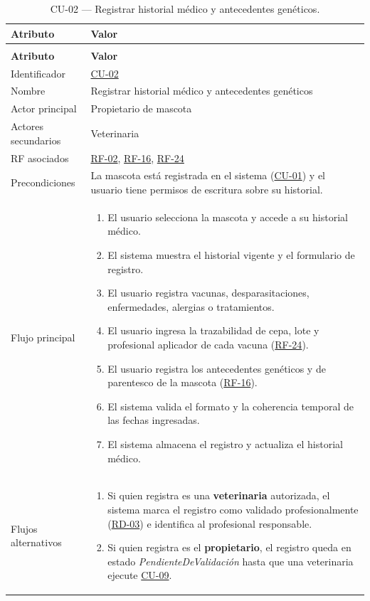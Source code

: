\documentclass[journal,onecolumn]{IEEEtran}
\makeatletter
\newenvironment{atributos}[2]{%
	\small
	\begin{longtable}{@{}>{\raggedright\arraybackslash}p{4.2cm} >{\raggedright\arraybackslash}p{11.2cm}@{}}
		\caption{#2}\label{tab:#1}\\
		\toprule
		\textbf{Atributo} & \textbf{Valor} \\
		\midrule
		\endfirsthead
		\multicolumn{2}{@{}l}{\small\itshape (continuación)}\\
		\toprule
		\textbf{Atributo} & \textbf{Valor} \\
		\midrule
		\endhead
		\bottomrule
		\endlastfoot
	}{%
	\end{longtable}
	\normalsize
}
\makeatother
\begin{document}
	\begin{atributos}{CU-02}{CU-02 --- Registrar historial médico y antecedentes genéticos.}
		Identificador & \hyperref[tab:CU-02]{CU-02} \\
		Nombre & Registrar historial médico y antecedentes genéticos \\
		Actor principal & Propietario de mascota \\
		Actores secundarios & Veterinaria \\
		RF asociados & \hyperref[tab:RF-02]{RF-02}, \hyperref[tab:RF-16]{RF-16}, \hyperref[tab:RF-24]{RF-24} \\
		Precondiciones & La mascota está registrada en el sistema (\hyperref[tab:CU-01]{CU-01}) y el usuario tiene permisos de escritura sobre su historial. \\
		Flujo principal &
		\begin{enumerate}[leftmargin=*, nosep]
			\item El usuario selecciona la mascota y accede a su historial médico.
			\item El sistema muestra el historial vigente y el formulario de registro.
			\item El usuario registra vacunas, desparasitaciones, enfermedades, alergias o tratamientos.
			\item El usuario ingresa la trazabilidad de cepa, lote y profesional aplicador de cada vacuna (\hyperref[tab:RF-24]{RF-24}).
			\item El usuario registra los antecedentes genéticos y de parentesco de la mascota (\hyperref[tab:RF-16]{RF-16}).
			\item El sistema valida el formato y la coherencia temporal de las fechas ingresadas.
			\item El sistema almacena el registro y actualiza el historial médico.
		\end{enumerate} \\
		Flujos alternativos &
		\begin{enumerate}[leftmargin=*, nosep]
			\item[7.1] Si quien registra es una \textbf{veterinaria} autorizada, el sistema marca el registro como validado profesionalmente (\hyperref[tab:RD-03]{RD-03}) e identifica al profesional responsable.
			\item[7.2] Si quien registra es el \textbf{propietario}, el registro queda en estado \emph{PendienteDeValidación} hasta que una veterinaria ejecute \hyperref[tab:CU-09]{CU-09}.
		\end{enumerate} \\

\end{atributos}
\end{document}
